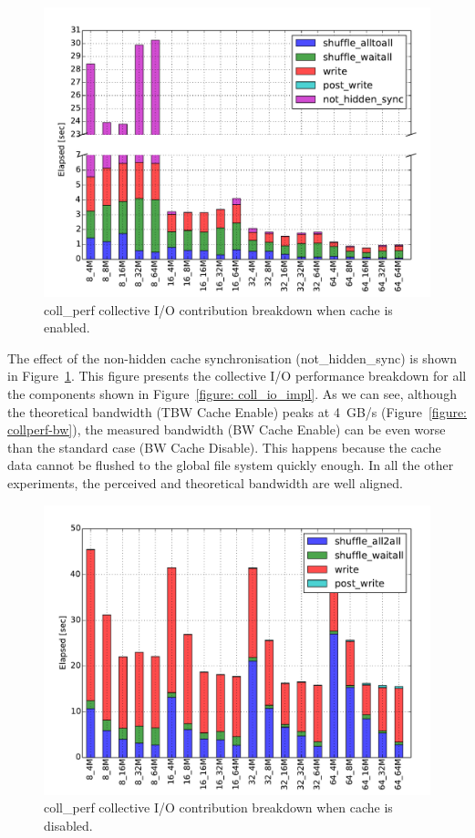 \begin{figure}[b!]
  \centering
  \includegraphics[width=0.95\columnwidth]{chapters/chapter3/figures/coll_perf_32GB_30sec_elapsed_enable}
  \caption{coll\_perf collective I/O contribution breakdown when cache is enabled.} %
  \label{figure: collperf-elaps-enable}
\end{figure}
The effect of the non-hidden cache synchronisation (not\_hidden\_sync) is shown in Figure~\ref{figure: collperf-elaps-enable}. This figure presents the collective I/O performance breakdown for all the components shown in Figure~\ref{figure: coll_io_impl}. As we can see, although the theoretical bandwidth (TBW Cache Enable) peaks at 4~GB/s (Figure~\ref{figure: collperf-bw}), the measured bandwidth (BW Cache Enable) can be even worse than the standard case (BW Cache Disable). This happens because the cache data cannot be flushed to the global file system quickly enough. In all the other experiments, the perceived and theoretical bandwidth are well aligned.

\begin{figure}[htb]
  \centering
  \includegraphics[width=0.95\columnwidth]{chapters/chapter3/figures/coll_perf_32GB_30sec_elapsed_disable}
  \caption{coll\_perf collective I/O contribution breakdown when cache is disabled.}
  \label{figure: collperf-elaps-disable}
\end{figure}

